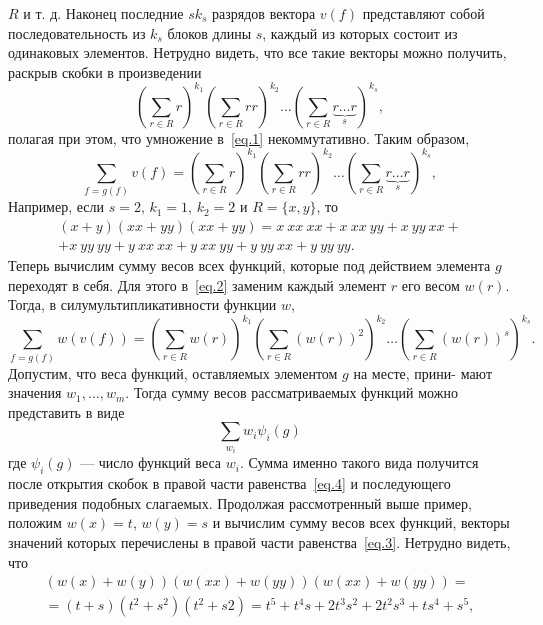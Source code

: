 \documentclass[12pt]{article}
\numberwithin{equation}{section} %
\begin{document}
$R$ и т. д. Наконец последние $s k_s$ разрядов вектора $v(f)$ представляют собой последовательность из $k_s$ блоков длины $s$, каждый из которых состоит из одинаковых элементов. Нетрудно видеть, что все такие векторы можно получить, раскрыв скобки в произведении
\begin{equation}
\left(\sum_{r \in R}r\right)^{k_1}
\left(\sum_{r \in R}r r\right)^{k_2}
\dots
\left(\sum_{r \in R} \underbrace{r \dots r}_s\right)^{k_s},
\label{eq.1}
\end{equation}
полагая при этом, что умножение в~\eqref{eq.1} некоммутативно. Таким образом,
\begin{equation}
\sum_{f=g(f)}v(f)=
\left(\sum_{r \in R}r\right)^{k_1}
\left(\sum_{r \in R}r r\right)^{k_2}
\dots
\left(\sum_{r \in R} \underbrace{r \dots r}_s\right)^{k_s},
\label{eq.2}
\end{equation}
Например, если $s=2$, $k_1=1$, $k_2=2$ и $R=\{x,y\}$, то
\begin{eqnarray}
(x+y)(xx+yy)(xx+yy)=x\ xx \ xx + x\ xx\ yy + x\ yy\ xx + 
\nonumber  \\
 + x\ yy\ yy + y\ xx\ xx + y\ xx\ yy + y\ yy\ xx + y\ yy\ yy.
\label{eq.3}
\end{eqnarray}
Теперь вычислим сумму весов всех функций, которые под действием
элемента $g$ переходят в себя. Для этого в~\eqref{eq.2} заменим каждый элемент $r$ его весом $w(r)$. Тогда, в силумультипликативности функции $w$,
\begin{equation}
\sum_{f=g(f)}w(v(f))=
\left(\sum_{r \in R}w(r)\right)^{k_1}
\left(\sum_{r \in R}(w(r))^2\right)^{k_2}
\dots
\left(\sum_{r \in R}(w(r))^s\right)^{k_s}.
\label{eq.4}    
\end{equation}
Допустим, что веса функций, оставляемых элементом $g$ на месте, прини-
мают значения $w_1, \dots ,w_m$. Тогда сумму весов рассматриваемых функций можно представить в виде
\begin{equation}
\sum_{w_i}w_i \psi_i (g)
\label{eq.5}     
\end{equation}
где $\psi_i(g)$ — число функций веса $w_i$. Сумма именно такого вида получится после открытия скобок в правой части равенства~\eqref{eq.4} и последующего приведения подобных слагаемых. Продолжая рассмотренный выше пример, положим $w(x)=t$, $w(y)=s$ и вычислим сумму весов всех функций, векторы значений которых перечислены в правой части равенства~\eqref{eq.3}. Нетрудно видеть, что
\begin{eqnarray}
(w(x) +w(y))(w(xx) +w(yy))(w(xx) +w(yy)) =
\nonumber  \\
= (t+s)(t^2+s^2)(t^2+ s2)=t^5+t^4s+2t^3s^2+2t^2s^3 +ts^4+s^5,
\nonumber
\end{eqnarray}
\end{document}
